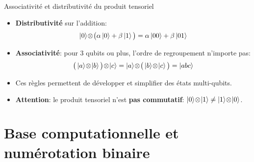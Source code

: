 \documentclass[aspectratio=169,12pt]{beamer}
\begin{document}
\begin{frame}{Associativité et distributivité du produit tensoriel}
  \begin{itemize}[<+->]
    \setlength{\itemsep}{0.6em}
    \item \textbf{Distributivité} sur l'addition:
    $$\ket{0}\!\otimes\!\big(\alpha\ket{0}+\beta\ket{1}\big)
      = \alpha\ket{00}+\beta\ket{01}$$
    \item \textbf{Associativité}: pour 3 qubits ou plus, l'ordre de regroupement n'importe pas:
    $$\big(\ket{a}\!\otimes\!\ket{b}\big)\!\otimes\!\ket{c}
      = \ket{a}\!\otimes\!\big(\ket{b}\!\otimes\!\ket{c}\big)
      = \ket{abc}$$
    \item Ces règles permettent de développer et simplifier des états multi-qubits.
    \item \textbf{Attention}: le produit tensoriel n'est \textbf{pas commutatif}:
     $\ket{0}\!\otimes\!\ket{1} \neq \ket{1}\!\otimes\!\ket{0}$.
  \end{itemize}
\end{frame}

\section{Base computationnelle et numérotation binaire}
\end{document}
